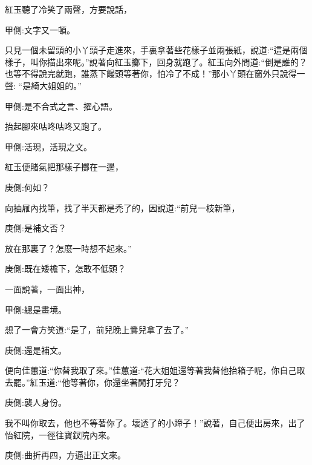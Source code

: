 \begin{parag}
    紅玉聽了冷笑了兩聲，方要說話，\begin{note}甲側:文字又一頓。\end{note}只見一個未留頭的小丫頭子走進來，手裏拿著些花樣子並兩張紙，說道:“這是兩個樣子，叫你描出來呢。”說著向紅玉擲下，回身就跑了。紅玉向外問道:“倒是誰的？也等不得說完就跑，誰蒸下饅頭等著你，怕冷了不成！”那小丫頭在窗外只說得一聲: “是綺大姐姐的。”\begin{note}甲側:是不合式之言、擢心語。\end{note}抬起腳來咕咚咕咚又跑了。\begin{note}甲側:活現，活現之文。\end{note}紅玉便賭氣把那樣子擲在一邊，\begin{note}庚側:何如？\end{note}向抽屜內找筆，找了半天都是禿了的，因說道:“前兒一枝新筆，\begin{note}庚側:是補文否？\end{note}放在那裏了？怎麼一時想不起來。”\begin{note}庚側:既在矮檐下，怎敢不低頭？\end{note}一面說著，一面出神，\begin{note}甲側:總是畫境。\end{note}想了一會方笑道:“是了，前兒晚上鶯兒拿了去了。”\begin{note}庚側:還是補文。\end{note}便向佳蕙道:“你替我取了來。”佳蕙道:“花大姐姐還等著我替他抬箱子呢，你自己取去罷。”紅玉道:“他等著你，你還坐著閒打牙兒？\begin{note}庚側:襲人身份。\end{note}我不叫你取去，他也不等著你了。壞透了的小蹄子！”說著，自己便出房來，出了怡紅院，一徑往寶釵院內來。\begin{note}庚側:曲折再四，方逼出正文來。\end{note}
\end{parag}


